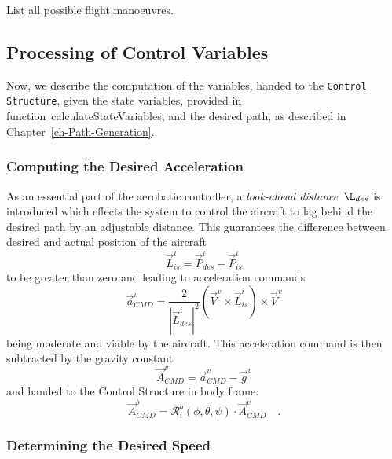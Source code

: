 \documentclass[11pt,a4paper]{scrartcl}		%
\begin{document}
List all possible flight manoeuvres.


\medskip





\subsection{Processing of Control Variables}

Now, we describe the computation of the variables, handed to the \texttt{Control Structure}, given the state variables, provided in function~\textsf{calculateStateVariables}, and the desired path, as described in Chapter~\ref{ch-Path-Generation}.

\subsubsection*{Computing the Desired Acceleration}

As an essential part of the aerobatic controller, a \textsl{look-ahead distance}~$\L_{des}$ is introduced which effects the system to control the aircraft to lag behind the desired path by an adjustable distance.
This guarantees the difference between desired and actual position of the aircraft 
\begin{equation}
\vec{L}_{is}^i = \vec{P}_{des}^i - \vec{P}_{is}^i
\end{equation}
to be greater than zero and leading to acceleration commands 
\begin{equation}
\vec{a}_{CMD}^v = \frac{2}{|\vec{L}_{des}^i|^2}\left(\vec{V}^v \times \vec{L}_{is}^i \right) \times \vec{V}^v
\end{equation}
being moderate and viable by the aircraft.
This acceleration command is then subtracted by the gravity constant
\begin{equation}
\vec{A}_{CMD}^v = \vec{a}_{CMD}^v - \vec{g}^v
\end{equation}
and handed to the Control Structure in body frame:
\begin{equation}
\vec{A}_{CMD}^b = \mathcal{R}_i^b(\phi,\theta,\psi) \cdot \vec{A}_{CMD}^v \quad .
\end{equation}

\medskip





\subsubsection*{Determining the Desired Speed}\label{ch-Determ-Desired-Speed}
\end{document}
